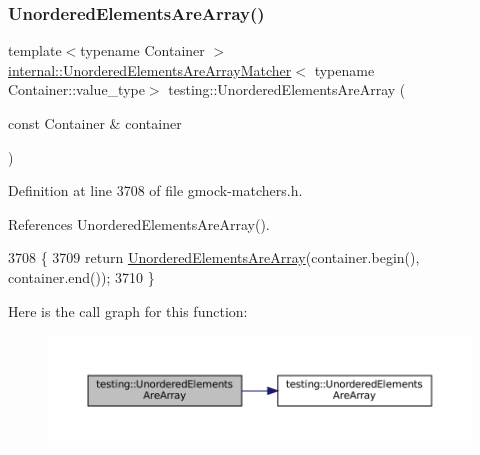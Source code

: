 \subsubsection{\texorpdfstring{Unordered\+Elements\+Are\+Array()}{UnorderedElementsAreArray()}\hspace{0.1cm}{\footnotesize\ttfamily [4/4]}}
{\footnotesize\ttfamily template$<$typename Container $>$ \\
\hyperlink{classtesting_1_1internal_1_1UnorderedElementsAreArrayMatcher}{internal\+::\+Unordered\+Elements\+Are\+Array\+Matcher}$<$ typename Container\+::value\+\_\+type$>$ testing\+::\+Unordered\+Elements\+Are\+Array (\begin{DoxyParamCaption}\item[{const Container \&}]{container }\end{DoxyParamCaption})\hspace{0.3cm}{\ttfamily [inline]}}



Definition at line 3708 of file gmock-\/matchers.\+h.



References Unordered\+Elements\+Are\+Array().


\begin{DoxyCode}
3708                                                       \{
3709   \textcolor{keywordflow}{return} \hyperlink{namespacetesting_a72b0ee2217293106fcf4971dc4a59f4c}{UnorderedElementsAreArray}(container.begin(), container.end());
3710 \}
\end{DoxyCode}
Here is the call graph for this function\+:
\nopagebreak
\begin{figure}[H]
\begin{center}
\leavevmode
\includegraphics[width=350pt]{namespacetesting_a72b0ee2217293106fcf4971dc4a59f4c_cgraph}
\end{center}
\end{figure}
\mbox{\label{namespacetesting_a3e800c56ae70a6d9955077a75d4971f1}} 
